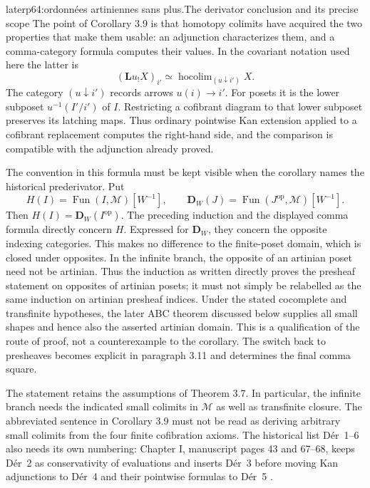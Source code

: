\begin{dcomment}{later}{p64:ordonnées artiniennes sans plus.}{The derivator conclusion and its precise scope}
The point of Corollary 3.9 is that homotopy colimits have acquired the two properties that make them usable: an adjunction characterizes them, and a comma-category formula computes their values. In the covariant notation used here the latter is
\[
 (\mathbf L u_!X)_{i'}\simeq
 \operatorname{hocolim}_{(u\downarrow i')}X.
\]
The category $(u\downarrow i')$ records arrows $u(i)\to i'$. For posets it is the lower subposet $u^{-1}(I'/i')$ of $I$. Restricting a cofibrant diagram to that lower subposet preserves its latching maps. Thus ordinary pointwise Kan extension applied to a cofibrant replacement computes the right-hand side, and the comparison is compatible with the adjunction already proved.

The convention in this formula must be kept visible when the corollary names the historical prederivator. Put
\[
 H(I)=\operatorname{Fun}(I,\mathcal M)[W^{-1}],
 \qquad
 \mathbf D_W(J)=\operatorname{Fun}(J^{\mathrm{op}},\mathcal M)[W^{-1}].
\]
Then $H(I)=\mathbf D_W(I^{\mathrm{op}})$. The preceding induction and the displayed comma formula directly concern $H$. Expressed for $\mathbf D_W$, they concern the opposite indexing categories. This makes no difference to the finite-poset domain, which is closed under opposites. In the infinite branch, the opposite of an artinian poset need not be artinian. Thus the induction as written directly proves the presheaf statement on opposites of artinian posets; it must not simply be relabelled as the same induction on artinian presheaf indices. Under the stated cocomplete and transfinite hypotheses, the later ABC theorem discussed below supplies all small shapes and hence also the asserted artinian domain. This is a qualification of the route of proof, not a counterexample to the corollary. The switch back to presheaves becomes explicit in paragraph 3.11 and determines the final comma square.

The statement retains the assumptions of Theorem 3.7. In particular, the infinite branch needs the indicated small colimits in $\mathcal M$ as well as transfinite closure. The abbreviated sentence in Corollary 3.9 must not be read as deriving arbitrary small colimits from the four finite cofibration axioms. The historical list Dér~1--6 also needs its own numbering: Chapter I, manuscript pages 43 and 67--68, keeps Dér~2 as conservativity of evaluations and inserts Dér~3 before moving Kan adjunctions to Dér~4 and their pointwise formulas to Dér~5 \citep{Grothendieck1990Derivateurs}.


\end{dcomment}
